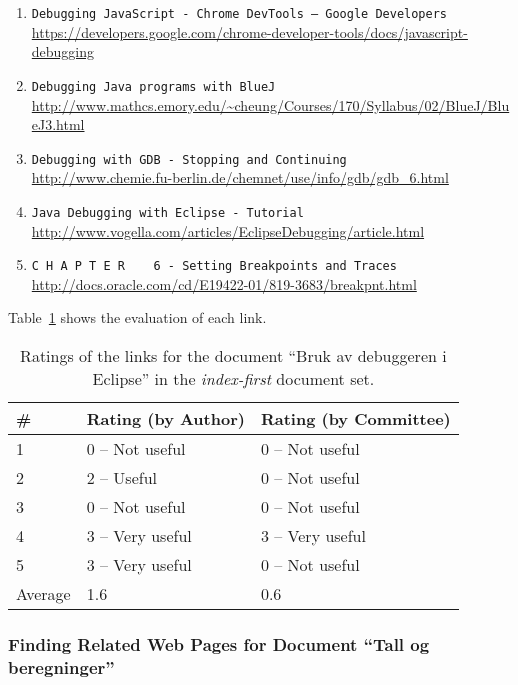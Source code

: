 \begin{enumerate}
\item
    \verb|Debugging JavaScript - Chrome DevTools — Google Developers| \\
    \url{https://developers.google.com/chrome-developer-tools/docs/javascript-debugging}
\item
    \verb|Debugging Java programs with BlueJ| \\
    \url{http://www.mathcs.emory.edu/~cheung/Courses/170/Syllabus/02/BlueJ/BlueJ3.html}
\item
    \verb|Debugging with GDB - Stopping and Continuing| \\
    \url{http://www.chemie.fu-berlin.de/chemnet/use/info/gdb/gdb_6.html}
\item
    \verb|Java Debugging with Eclipse - Tutorial| \\
    \url{http://www.vogella.com/articles/EclipseDebugging/article.html}
\item
    \verb|C H A P T E R    6 - Setting Breakpoints and Traces| \\
    \url{http://docs.oracle.com/cd/E19422-01/819-3683/breakpnt.html}
\end{enumerate}

Table~\ref{tab:ratings-no-bruk-av-debuggeren-i-eclipse-2} shows the evaluation of each link.
\begin{table}[H]
\centering
\begin{tabular}{|l|l|l|}
\hline\hline
    \# & Rating (by Author) & Rating (by Committee) \\
\hline
    1 & 0 -- Not useful & 0 -- Not useful \\
    2 & 2 -- Useful & 0 -- Not useful \\
    3 & 0 -- Not useful & 0 -- Not useful \\
    4 & 3 -- Very useful & 3 -- Very useful \\
    5 & 3 -- Very useful & 0 -- Not useful \\
\hline
    Average & 1.6 & 0.6 \\
\hline\hline
\end{tabular}
\caption{Ratings of the links for the document ``Bruk av debuggeren i Eclipse'' in the \textit{index-first} document set.}
\label{tab:ratings-no-bruk-av-debuggeren-i-eclipse-2}
\end{table}


\subsubsection{Finding Related Web Pages for Document ``Tall og beregninger''}
\label{subsubsec:no-tall-og-beregninger-2}

